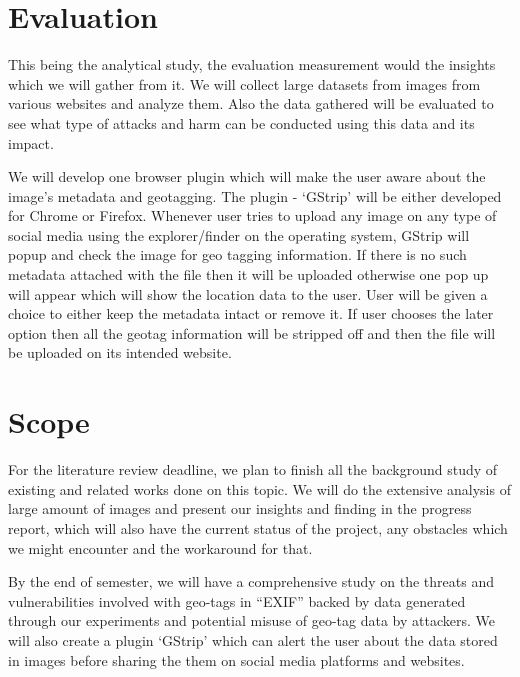 \documentclass[12pt]{extarticle}
\begin{document}
\begin{normalsize}
		\section{Evaluation}

		This being the analytical study, the evaluation measurement would the insights which we will gather from it. We will collect large datasets from images from various websites and analyze them. Also the data gathered will be evaluated to see what type of attacks and harm can be conducted using this data and its impact.

\vspace{10}


We will develop one browser plugin which will make the user aware about the image’s metadata and geotagging. The plugin - ‘GStrip’ will be either developed for Chrome or Firefox. Whenever user tries to upload any image on any type of social media using the explorer/finder on the operating system, GStrip will popup and check the image for geo tagging information. If there is no such metadata attached with the file then it will be uploaded otherwise one pop up will appear which will show the location data to the user. User will be given a choice to either keep the metadata intact or remove it. If user chooses the later option then all the geotag information will be stripped off and then the file will be uploaded on its intended website.

		\section{Scope}

        For the literature review deadline, we plan to finish all the background study of existing and related works done on this topic. We will do the extensive analysis of large amount of images and present our insights and finding in the progress report, which will also have the current status of the project, any obstacles which we might encounter and the workaround for that.

        \vspace{10}

By the end of semester, we will have a comprehensive study on the threats and vulnerabilities involved with geo-tags in “EXIF” backed by data generated through our experiments and potential misuse of geo-tag data by attackers. We will also create a plugin ‘GStrip’ which can alert the user about the data stored in images before sharing the them on social media platforms and websites.

\end{normalsize}
\end{document}
